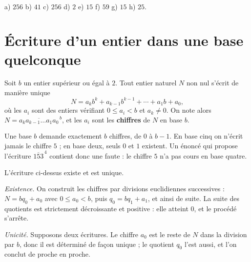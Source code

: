 \begin{corrige}[automatismes]
a) $256$ \quad b) $41$ \quad c) $256$ \quad d) $2$ \quad e) $15$ \quad
f) $59$ \quad g) $15$ \quad h) $25$.
\end{corrige}

\section{Écriture d'un entier dans une base quelconque}

\begin{definition}
Soit $b$ un entier supérieur ou égal à $2$. Tout entier naturel $N$ non nul
s'écrit de manière unique
\[
  N = a_{k}b^{k}+a_{k-1}b^{k-1}+\cdots+a_{1}b+a_{0},
\]
où les $a_{i}$ sont des entiers vérifiant $0 \leq a_{i} < b$ et
$a_{k} \neq 0$. On note alors
$N = \overline{a_{k}a_{k-1}\dots a_{1}a_{0}}^{\,b}$, et les $a_{i}$ sont les
\textbf{chiffres} de $N$ en base $b$.
\end{definition}

\begin{remarque}
Une base $b$ demande exactement $b$ chiffres, de $0$ à $b-1$. En base cinq on
n'écrit jamais le chiffre $5$ ; en base deux, seuls $0$ et $1$ existent. Un
énoncé qui propose l'écriture $\overline{153}^{\,4}$ contient donc une faute :
le chiffre $5$ n'a pas cours en base quatre.
\end{remarque}

\begin{theoreme}
L'écriture ci-dessus existe et est unique.
\end{theoreme}

\begin{demonstration}
\emph{Existence.} On construit les chiffres par divisions euclidiennes
successives : $N = bq_{0}+a_{0}$ avec $0 \leq a_{0} < b$, puis
$q_{0} = bq_{1}+a_{1}$, et ainsi de suite. La suite des quotients est
strictement décroissante et positive : elle atteint $0$, et le procédé
s'arrête.

\smallskip
\emph{Unicité.} Supposons deux écritures. Le chiffre $a_{0}$ est le reste de
$N$ dans la division par $b$, donc il est déterminé de façon unique ; le
quotient $q_{0}$ l'est aussi, et l'on conclut de proche en proche.
\end{demonstration}

